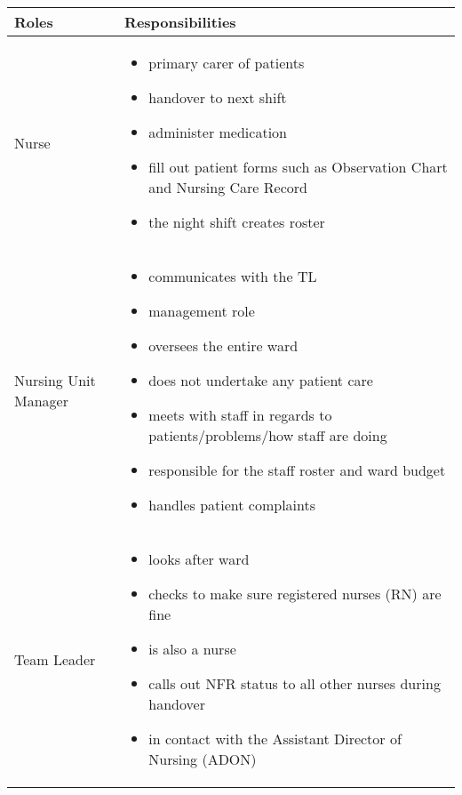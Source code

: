 \hfil\begin{tabular}{|p{5cm}|p{11cm}|}
\hline
{\hfil\bf Roles} & {\hfil\bf Responsibilities} \\
\hline
Nurse & \vspace{-5mm}\begin{itemize}
\item primary carer of patients
\item handover to next shift
\item administer medication
\item fill out patient forms such as Observation Chart and Nursing Care Record
\item the night shift creates roster
\end{itemize} \\ 
\hline
Nursing Unit Manager & \vspace{-5mm}\begin{itemize}
\item communicates with the TL
\item management role
\item oversees the entire ward
\item does not undertake any patient care
\item meets with staff in regards to patients/problems/how staff are doing
\item responsible for the staff roster and ward budget
\item handles patient complaints
\end{itemize} \\
\hline
Team Leader & 
\vspace{-5mm}\begin{itemize}
\item looks after ward
\item checks to make sure registered nurses (RN) are fine
\item is also a nurse
\item calls out \gls{NFR} status to all other nurses during handover
\item in contact with the Assistant Director of Nursing (ADON)
\end{itemize} \\
\hline
\end{tabular}

\newpage

